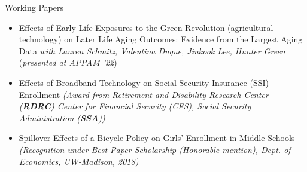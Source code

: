 \documentclass{resume} %
\begin{document}
\begin{rSection}{Working Papers}
\begin{itemize}
\item Effects of Early Life Exposures to the Green Revolution (agricultural technology) on Later Life Aging Outcomes: Evidence from the Largest Aging Data \textit{with Lauren Schmitz, Valentina Duque, Jinkook Lee, Hunter Green} (\textit{\scriptsize{presented at APPAM '22}}) 

\item Effects of Broadband Technology on Social Security Insurance (SSI) Enrollment \textit{\scriptsize{(Award from Retirement and Disability Research Center (\textbf{RDRC}) Center for Financial Security (CFS), Social Security Administration (\textbf{SSA}))}}

\item Spillover Effects of a Bicycle Policy on Girls' Enrollment in Middle Schools \textit{\scriptsize{(Recognition under Best Paper Scholarship (Honorable mention), Dept. of Economics, UW-Madison, 2018) }}


\end{itemize}








\end{rSection}
\end{document}
